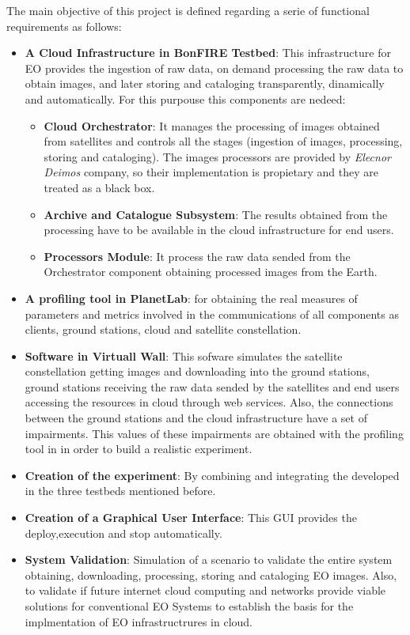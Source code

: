 The main objective of this project is defined regarding a serie of functional
requirements as follows:
\begin{itemize}
  
\item {\textbf{A Cloud Infrastructure in BonFIRE Testbed}: This
  infrastructure for \ac{EO} provides the ingestion of raw data, on demand processing the raw
  data to obtain images, and later storing and cataloging transparently,
  dinamically and automatically. For this purpouse this components are nedeed:
}
\begin{itemize}

\item{\textbf{Cloud Orchestrator}: It manages the
  processing of images obtained from satellites and controls all the stages
  (ingestion of images, processing, storing and cataloging). The images
  processors are provided by \emph{Elecnor Deimos} company, so their implementation is propietary and they are treated as a black box.}
\item {\textbf{Archive and Catalogue Subsystem}: The
  results obtained from the processing have to be available in the cloud
  infrastructure for end users.}
\item{\textbf{Processors Module}: It process the raw data sended from
  the Orchestrator component obtaining processed images from the Earth.}  
\end{itemize}
\item {\textbf{A profiling tool in PlanetLab}: for obtaining the real measures of
  parameters and metrics involved in the communications of all components as
  clients, ground stations, cloud and satellite constellation.}


\item {\textbf{Software in Virtuall Wall}: This sofware simulates the satellite
  constellation getting images and downloading into the ground stations, ground
  stations receiving the raw data sended by the satellites and end users
  accessing the resources in cloud through web services. Also, the connections
  between the ground stations and the cloud infrastructure have a set of
  impairments. This values of these impairments are obtained with the profiling tool in
  \pl in order to build a  realistic experiment.}

\item {\textbf{Creation of the experiment}: By combining and integrating
  the developed in the three testbeds mentioned before.}

\item {\textbf{Creation of a Graphical User Interface}: This \ac{GUI} provides
  the deploy,execution and stop automatically.} 

\item {\textbf{System Validation}: Simulation of a scenario to validate the
  entire system obtaining, downloading, processing, storing and cataloging
  \ac{EO} images. Also, to validate if future internet cloud computing
  and networks provide viable solutions for conventional \ac{EO}
  Systems to establish the basis for the implmentation of \ac{EO} infrastructrures in
  cloud. }

\end{itemize}
